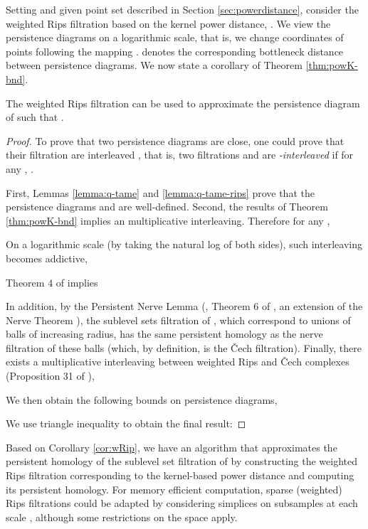 \documentclass[11pt]{myclass}
\begin{document}
Setting  and given point set  described in Section \ref{sec:powerdistance},  consider the weighted Rips filtration  based on the kernel power distance, . 
We view the persistence diagrams on a logarithmic scale, that is, we change coordinates of points following the mapping .  denotes the corresponding bottleneck distance between persistence diagrams.  We now state a corollary of Theorem \ref{thm:powK-bnd}.
\begin{corollary}
\label{cor:wRip}
The weighted Rips filtration  can be used to  approximate the persistence diagram of  such that 
.
\end{corollary}
\begin{proof}
To prove that two persistence diagrams are close, one could prove that their filtration are interleaved \cite{ChazalCohen-SteinerGlisse2009}, 
that is, two filtrations  and  are \emph{-interleaved} if for any , .  


First, Lemmas \ref{lemma:q-tame} and \ref{lemma:q-tame-rips} prove that the persistence diagrams  and  are well-defined. 
Second, the results of Theorem \ref{thm:powK-bnd} implies an  multiplicative interleaving. 
Therefore for any , 

On a logarithmic scale (by taking the natural log of both sides), such interleaving becomes addictive, 

Theorem 4 of \cite{ChazalSilvaGlisse2013} implies 

In addition, by the Persistent Nerve Lemma (\cite{ChazalOudot2008}, Theorem 6 of \cite{Sheehy2012}, an extension of the Nerve Theorem \cite{Hatcher2002}), 
the sublevel sets filtration of , which correspond to unions of balls of increasing radius, has the same persistent homology as the nerve filtration of these balls (which, by definition, is the \v{C}ech filtration).
Finally, there exists a multiplicative interleaving between weighted Rips and \v{C}ech complexes (Proposition 31 of \cite{ChazalSilvaGlisse2013}), 

We then obtain the following bounds on persistence diagrams,  

We use triangle inequality to obtain the final result: 

\end{proof}

Based on Corollary \ref{cor:wRip}, we have an algorithm that approximates the persistent homology of the sublevel set filtration of  by constructing the weighted Rips filtration corresponding to the kernel-based power distance and computing its persistent homology. 
For memory efficient computation, sparse (weighted) Rips filtrations could be adapted by considering simplices on subsamples at each scale \cite{Sheehy2013,ChazalSilvaGlisse2013}, although some restrictions on the space apply. 
\end{document}
